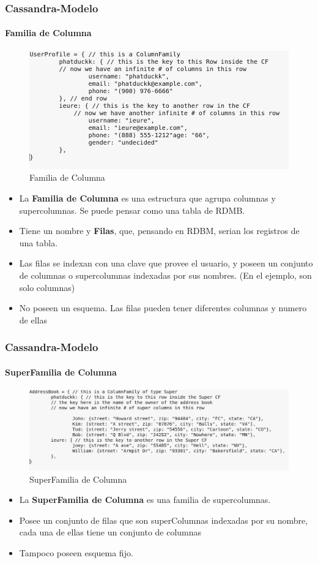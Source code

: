 \documentclass{beamer}
\begin{document}
\begin{frame}
  \frametitle{Cassandra-Modelo}
  \framesubtitle{Familia de Columna}
   \begin{figure}[h!]
      \centering        
      \includegraphics[scale=0.25]{familia.jpg}
      \caption{Familia de Columna}
  \end{figure}

  \begin{itemize}
    \setlength{\itemsep}{2pt}
    \item La \textbf{Familia de Columna} es una estructura que agrupa columnas y supercolumnas. Se puede pensar como una tabla de RDMB.
    \pause
    \item Tiene un nombre y \textbf{Filas}, que, pensando en RDBM, serian los registros de una tabla.
    \pause
    \item Las filas se indexan con una clave que provee el usuario, y poseen un conjunto de columnas o supercolumnas indexadas por sus nombres. (En el ejemplo, son solo columnas)
    \item No poseen un esquema. Las filas pueden tener diferentes columnas y numero de ellas
  \end{itemize}
\end{frame}


\begin{frame}
  \frametitle{Cassandra-Modelo}
  \framesubtitle{SuperFamilia de Columna}
   \begin{figure}[h!]
      \centering        
      \includegraphics[scale=0.25]{superfamily.jpg}
      \caption{SuperFamilia de Columna}
  \end{figure}

  \begin{itemize}
    \setlength{\itemsep}{2pt}
    \item La \textbf{SuperFamilia de Columna} es una familia de supercolumnas.
    \pause
    \item Posee un conjunto de filas que son superColumnas indexadas por su nombre, cada una de ellas tiene un conjunto de columnas
    \pause
    \item Tampoco poseen esquema fijo.
  \end{itemize}
\end{frame}
\end{document}
